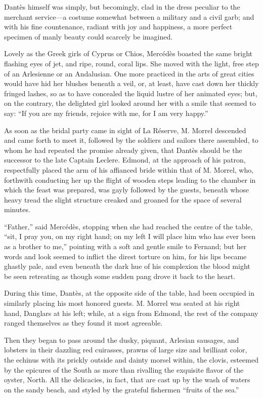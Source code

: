 Dantès himself was simply, but becomingly, clad in the dress peculiar
to the merchant service—a costume somewhat between a military and a
civil garb; and with his fine countenance, radiant with joy and
happiness, a more perfect specimen of manly beauty could scarcely be
imagined.

Lovely as the Greek girls of Cyprus or Chios, Mercédès boasted the same
bright flashing eyes of jet, and ripe, round, coral lips. She moved
with the light, free step of an Arlesienne or an Andalusian. One more
practiced in the arts of great cities would have hid her blushes
beneath a veil, or, at least, have cast down her thickly fringed
lashes, so as to have concealed the liquid lustre of her animated eyes;
but, on the contrary, the delighted girl looked around her with a smile
that seemed to say: “If you are my friends, rejoice with me, for I am
very happy.”

As soon as the bridal party came in sight of La Réserve, M. Morrel
descended and came forth to meet it, followed by the soldiers and
sailors there assembled, to whom he had repeated the promise already
given, that Dantès should be the successor to the late Captain Leclere.
Edmond, at the approach of his patron, respectfully placed the arm of
his affianced bride within that of M. Morrel, who, forthwith conducting
her up the flight of wooden steps leading to the chamber in which the
feast was prepared, was gayly followed by the guests, beneath whose
heavy tread the slight structure creaked and groaned for the space of
several minutes.

“Father,” said Mercédès, stopping when she had reached the centre of
the table, “sit, I pray you, on my right hand; on my left I will place
him who has ever been as a brother to me,” pointing with a soft and
gentle smile to Fernand; but her words and look seemed to inflict the
direst torture on him, for his lips became ghastly pale, and even
beneath the dark hue of his complexion the blood might be seen
retreating as though some sudden pang drove it back to the heart.

During this time, Dantès, at the opposite side of the table, had been
occupied in similarly placing his most honored guests. M. Morrel was
seated at his right hand, Danglars at his left; while, at a sign from
Edmond, the rest of the company ranged themselves as they found it most
agreeable.

Then they began to pass around the dusky, piquant, Arlesian sausages,
and lobsters in their dazzling red cuirasses, prawns of large size and
brilliant color, the echinus with its prickly outside and dainty morsel
within, the clovis, esteemed by the epicures of the South as more than
rivalling the exquisite flavor of the oyster, North. All the
delicacies, in fact, that are cast up by the wash of waters on the
sandy beach, and styled by the grateful fishermen “fruits of the sea.”

